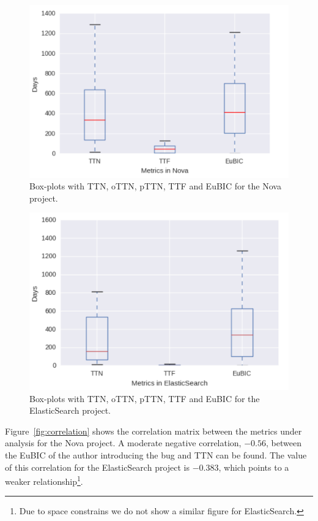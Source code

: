 \documentclass[10pt, conference]{IEEEtran}
\begin{document}
\begin{figure}[ht]
\centering
\includegraphics[width=\columnwidth]{boxplotNova.png}
\caption{Box-plots with TTN, oTTN, pTTN, TTF and EuBIC for the Nova project.}
\label{fig:meansOfNova}       %
\end{figure}

\begin{figure}[ht]
\centering
\includegraphics[width=\columnwidth]{boxplotES.png}
\caption{Box-plots with TTN, oTTN, pTTN, TTF and EuBIC for the ElasticSearch project.}
\label{fig:meansOfES}       %
\end{figure}

Figure~\ref{fig:correlation} shows the correlation matrix between the metrics under analysis for the Nova project. A moderate negative correlation, $-0.56$, between the EuBIC of the author introducing the bug and TTN can be found. The value of this correlation for the ElasticSearch project is $-0.383$, which points to a weaker relationship\footnote{Due to space constrains we do not show a similar figure for ElasticSearch.}.
\end{document}
